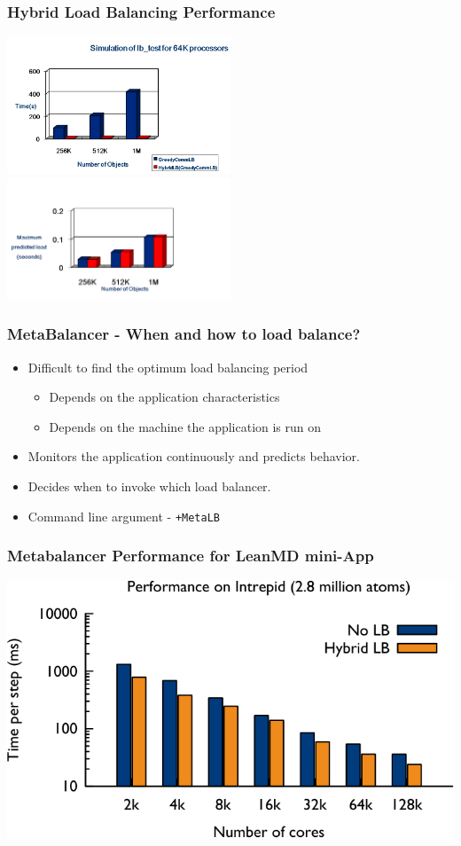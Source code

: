 \begin{frame}[fragile]
\frametitle{Hybrid Load Balancing Performance}
\includegraphics[width=0.5\textwidth]{figures/hybridLBPerf}
\includegraphics[width=0.5\textwidth]{figures/hybridLBquality}
\end{frame}

\begin{frame}[fragile]
\frametitle{MetaBalancer - When and how to load balance?}
\begin{itemize}    
    \item Difficult to find the optimum load balancing period
    \begin{itemize}
       \item Depends on the application characteristics
       \item Depends on the machine the application is run on
    \end{itemize}
    
    \item Monitors the application continuously and predicts behavior.
    \item Decides when to invoke which load balancer.
    \item Command line argument - \texttt{+MetaLB}
\end{itemize}
\end{frame}

\begin{frame}[fragile]
\frametitle{Metabalancer Performance for LeanMD mini-App}
\includegraphics{figures/bgp-metabalancer-leanmd}
\end{frame}
